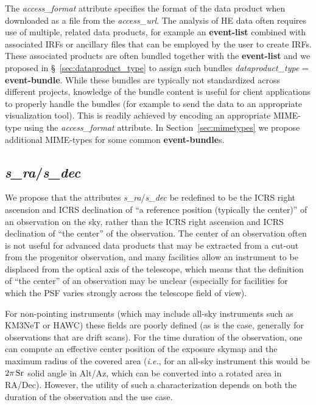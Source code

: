 \documentclass[11pt,a4paper]{ivoa}
\begin{document}
The {\em access\_format\/} attribute specifies the format of the data product when downloaded as a file from the {\em access\_url\/}.  The analysis of HE data often requires use of multiple, related data products, for example an {\bf event-list} combined with associated IRFs or ancillary files that can be employed by the user to create IRFs.  These associated products are often bundled together with the {\bf event-list} and we proposed in \S~\ref{sec:dataproduct_type} to assign such bundles {\em dataproduct\_type\/} = {\bf event-bundle}.  While these bundles are typically not standardized across different projects, knowledge of the bundle content is useful for client applications to properly handle the bundles (for example to send the data to an appropriate visualization tool).  This is readily achieved by encoding an appropriate MIME-type using the {\em access\_format\/} attribute.  In Section~\ref{sec:mimetypes} we propose additional MIME-types for some common {\bf event-bundle}s.

\subsection{{\em s\_ra\/}/{\em s\_dec}}

We propose that the attributes {\em s\_ra\/}/{\em s\_dec} be redefined to be the ICRS right ascension and ICRS declination of ``a reference position (typically the center)'' of an observation on the sky, rather than the ICRS right ascension and ICRS declination of ``the center'' of the observation.  The center of an observation often is not useful for advanced data products that may be extracted from a cut-out from the progenitor observation, and many facilities allow an instrument to be displaced from the optical axis of the telescope, which means that the definition of ``the center'' of an observation may be unclear (especially for facilities for which the PSF varies strongly across the telescope field of view).

For non-pointing instruments (which may include all-sky instruments such as KM3NeT or HAWC) these fields are poorly defined (as is the case, generally for observations that are drift scans).  For the time duration of the observation, one can compute an effective center position of the exposure skymap and the maximum radius of the covered area ({\em i.e.\/}, for an all-sky instrument this would be $2\pi\,\rm Sr$ solid angle in Alt/Az, which can be converted into a rotated area in RA/Dec).  However, the utility of such a characterization depends on both the duration of the observation and the use case.
\end{document}
